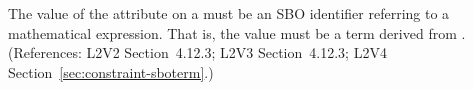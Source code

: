 The value of the  attribute on a \Constraint must be an SBO
identifier referring to a mathematical expression.  That is, the value must
be a term derived from \sbomathformula.  (References: L2V2 Section~4.12.3;
L2V3 Section~4.12.3; L2V4 Section~\ref{sec:constraint-sboterm}.)
